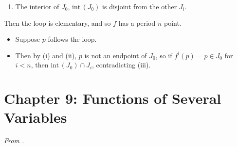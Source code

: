 \documentclass[../notes.tex]{subfiles}
\begin{document}
\begin{itemize}
\begin{enumerate}[label={(\roman*)}]
        \item The interior of $J_0$, $\text{int}\,(J_0)$ is disjoint from the other $J_i$.
    \end{enumerate}
    Then the loop is elementary, and so $f$ has a period $n$ point.
    \begin{itemize}
        \item Suppose $p$ follows the loop.
        \item Then by (i) and (ii), $p$ is not an endpoint of $J_0$, so if $f^i(p)=p\in J_0$ for $i<n$, then $\text{int}\,(J_0)\cap J_i$, contradicting (iii).
    \end{itemize}
\end{itemize}



\section{Chapter 9: Functions of Several Variables}
\emph{From \textcite{bib:Rudin}.}
\end{document}
